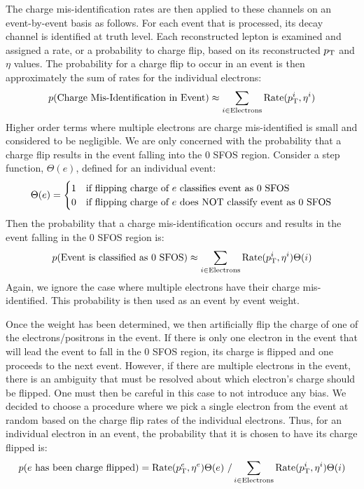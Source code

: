 The charge mis-identification rates are then applied to these channels on an 
event-by-event basis as follows.
For each event that is processed, its decay channel is identified 
at truth level. Each reconstructed lepton
is examined  and assigned a rate, or a probability to charge flip, 
based on its reconstructed $p_{\mathrm{T}}$ and $\eta$ values.
The probability for a charge flip to occur in an event is then approximately 
the sum of rates for the individual electrons:
\begin{equation}
p(\textrm{Charge Mis-Identification in Event}) \approx \sum_{i \in \textrm{Electrons}}  \textrm{Rate}(\pt^i,\eta^i) 
\end{equation}
Higher order terms where multiple electrons are charge mis-identified is 
small and considered to be negligible.
We are only concerned with the probability that a charge flip results in the 
event falling into the 0 SFOS region. 
Consider a step function, $\Theta(e)$, defined for an individual event:
\[
\Theta(e) = 
\begin{cases}
\hfill 1 \hfill & \text{if flipping charge of $e$ classifies event as 0 SFOS} \\
\hfill 0 \hfill & \text{if flipping charge of $e$ does NOT classify event as 0 SFOS}\\
\end{cases}
\]
Then the probability that a charge mis-identification occurs and results in 
the event falling in the 0 SFOS region is:
\begin{equation}
p(\textrm{Event is classified as 0 SFOS}) \approx \sum_{i \in \textrm{Electrons}}  \textrm{Rate}(\pt^i,\eta^i)\Theta(i) 
\end{equation}
Again, we ignore the case where multiple electrons have their charge 
mis-identified.  This probability is then used as an event by event weight. 


Once the weight has been determined, we then artificially flip the charge of 
one of the electrons/positrons in the event.
If there is only one electron in the event that will lead the event 
to fall in the 0 SFOS region, its charge is flipped
and one proceeds to the next event.  However, if there are multiple electrons 
in the event, there is an ambiguity that must be resolved
about which electron's charge should be flipped. One must then be careful in 
this case to not introduce any bias.
We decided to choose a procedure where we pick a single electron from the 
event at random based on the charge flip rates
of the individual electrons. Thus, for an individual electron in an 
event, the probability that it is chosen to have its charge
flipped is:
\begin{equation}
p(\textrm{$e$ has been charge flipped}) = \textrm{Rate}(\pt^e,\eta^e)\Theta(e)~/\sum_{i \in \textrm{Electrons}} \textrm{Rate}(\pt^i,\eta^i)\Theta(i)
\end{equation}

